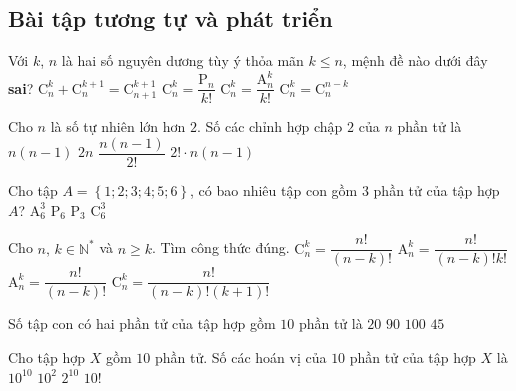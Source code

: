 \subsection{Bài tập tương tự và phát triển}
\begin{ex} %
	Với $k$, $n$ là hai số nguyên dương tùy ý thỏa mãn $k\leq n$, mệnh đề nào dưới đây \textbf{sai}?
	\choice
	{$\mathrm{C}^k_n+\mathrm{C}^{k+1}_n=\mathrm{C}^{k+1}_{n+1}$}
	{\True $\mathrm{C}^k_n=\dfrac{\mathrm{P}_n}{k!}$}
	{$\mathrm{C}^k_n=\dfrac{\mathrm{A}^k_n}{k!}$}
	{$\mathrm{C}^k_n=\mathrm{C}^{n-k}_n$}
\end{ex}
\begin{ex}%
	Cho $n$ là số tự nhiên lớn hơn $2$. Số các chỉnh hợp chập $2$ của $n$ phần tử là
	\choice
	{\True $n(n-1)$}
	{$2n$}
	{$\dfrac{n(n-1)}{2!}$}
	{$2!\cdot n(n-1)$}
\end{ex}
\begin{ex}%
	Cho tập $A=\left\{1;2;3;4;5;6\right\}$, có bao nhiêu tập con gồm $3$ phần tử của tập hợp $A$?
	\choice
	{$\mathrm{A}^3_6$}
	{$\mathrm{P}_6$}
	{$\mathrm{P}_3$}
	{\True $\mathrm{C}^3_6$}
\end{ex}
\begin{ex}%
	Cho $n,\,k\in \mathbb{N}^*$ và $n\geq k$. Tìm công thức đúng.
	\choice
	{$\mathrm{C}^k_n=\dfrac{n!}{(n-k)!}$}
	{$\mathrm{A}^k_n=\dfrac{n!}{(n-k)! k!}$}
	{\True $\mathrm{A}^k_n=\dfrac{n!}{(n-k)!}$}
	{$\mathrm{C}^k_n=\dfrac{n!}{(n-k)! (k+1)!}$}
\end{ex}
\begin{ex}%
	Số tập con có hai phần tử của tập hợp gồm $10$ phần tử là
	\choice
	{$20$}
	{$90$}
	{$100$}
	{\True $45$}
\end{ex}
\begin{ex}%
Cho tập hợp $X$ gồm $10$ phần tử. Số các hoán vị của $10$ phần tử của tập hợp $X$ là 	
	\choice
	{$10^{10}$}
	{$10^2$}
	{$2^{10}$}
	{\True $10!$}
\end{ex}
